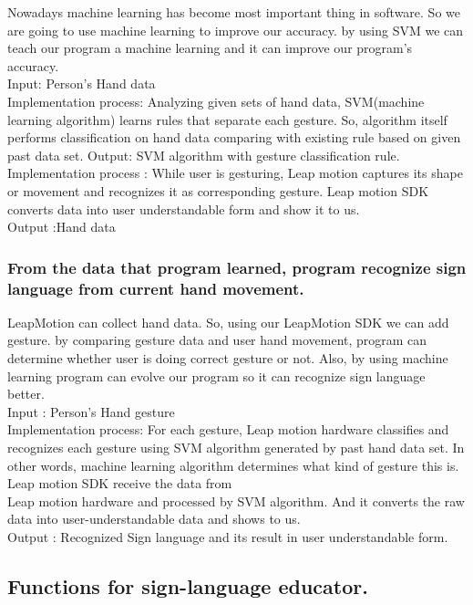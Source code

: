 \documentclass[10pt,journal,compsoc]{IEEEtran}
\begin{document}
Nowadays machine learning has become most important thing in software. So we are going to use machine learning to improve our accuracy. by using SVM we can teach our program a machine learning and it can improve our program’s accuracy.
\\Input: Person's Hand data
\\Implementation process: Analyzing given sets of hand data, SVM(machine learning algorithm) learns rules that separate each gesture. So, algorithm itself performs classification on hand data comparing with existing rule based on given past data set.
Output: SVM algorithm with gesture classification rule.
\\Implementation process : While user is gesturing, Leap motion captures its shape or movement and recognizes it as corresponding gesture. Leap motion SDK converts data into user understandable form and show it to us.
\\Output :Hand data
\subsubsection{From the data that program learned, program recognize sign language from current hand movement.}

LeapMotion can collect hand data. So, using our LeapMotion SDK we can add gesture. by comparing gesture data and user hand movement, program can determine whether user is doing correct gesture or not. Also, by using machine learning program can evolve our program so it can recognize sign language better.
\\Input : Person's Hand gesture
\\Implementation process: For each gesture, Leap motion hardware classifies and recognizes each gesture using SVM algorithm generated by past hand data set. In other words, machine learning algorithm determines what kind of gesture this is. Leap motion SDK receive the data from \\Leap motion hardware and processed by SVM algorithm. And it converts the raw data into user-understandable data and shows to us.
\\Output : Recognized Sign language and its result in user understandable form.

\subsection{Functions for sign-language educator.\\}
\end{document}
